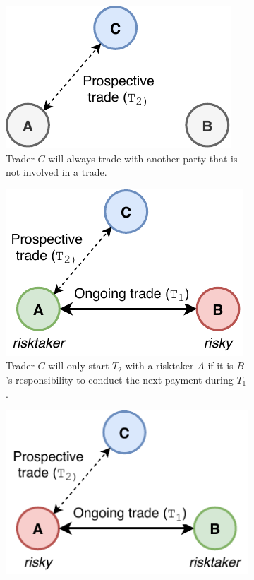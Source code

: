 \begin{figure}[t]
	\centering
	\begin{subfigure}[t]{.33\textwidth}
		\centering
		\captionsetup{width=.9\linewidth}
		\includegraphics[width=.9\linewidth]{xchange/assets/trade_1}
		\caption{Trader $ C $ will always trade with another party that is not involved in a trade.}
		\label{fig:trade_1}
	\end{subfigure}%
	\begin{subfigure}[t]{.33\textwidth}
		\centering
		\captionsetup{width=.9\linewidth}
		\includegraphics[width=.9\linewidth]{xchange/assets/trade_2}
		\caption{Trader $ C $ will only start $ T_2 $ with a risktaker $ A $ if it is $ B $'s responsibility to conduct the next payment during $ T_1 $.}
		\label{fig:trade_2}
	\end{subfigure}%
	\begin{subfigure}[t]{.33\textwidth}
		\centering
		\captionsetup{width=.9\linewidth}
		\includegraphics[width=.9\linewidth]{xchange/assets/trade_3}

\end{subfigure}
\end{figure}
